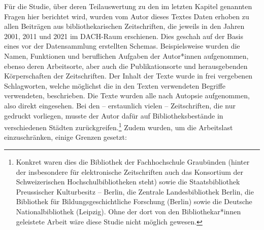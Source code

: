 \documentclass[a4paper,
fontsize=11pt,
oneside,
numbers=noperiodatend,
parskip=half-,
bibliography=totoc,
final
]{scrartcl}
\begin{document}
Für die Studie, über deren Teilauswertung zu den im letzten Kapitel
genannten Fragen hier berichtet wird, wurden vom Autor dieses Textes
Daten erhoben zu allen Beiträgen aus bibliothekarischen Zeitschriften,
die jeweils in den Jahren 2001, 2011 und 2021 im DACH-Raum erschienen.
Dies geschah auf der Basis eines vor der Datensammlung erstellten
Schemas. Beispielsweise wurden die Namen, Funktionen und beruflichen
Aufgaben der Autor*innen aufgenommen, ebenso deren Arbeitsorte, aber
auch die Publikationsorte und herausgebenden Körperschaften der
Zeitschriften. Der Inhalt der Texte wurde in frei vergebenen
Schlagworten, welche möglichst die in den Texten verwendeten Begriffe
verwendeten, beschrieben. Die Texte wurden alle nach Autopsie
aufgenommen, also direkt eingesehen. Bei den -- erstaunlich vielen --
Zeitschriften, die nur gedruckt vorliegen, musste der Autor dafür auf
Bibliotheksbestände in verschiedenen Städten zurückgreifen.\footnote{Konkret
  waren dies die Bibliothek der Fachhochschule Graubünden (hinter der
  insbesondere für elektronische Zeitschriften auch das Konsortium der
  Schweizerischen Hochschulbibliotheken steht) sowie die
  Staatsbibliothek Preussischer Kulturbesitz -- Berlin, die Zentrale
  Landesbibliothek Berlin, die Bibliothek für Bildungsgeschichtliche
  Forschung (Berlin) sowie die Deutsche Nationalbibliothek (Leipzig).
  Ohne der dort von den Bibliothekar*innen geleistete Arbeit wäre diese
  Studie nicht möglich gewesen.} Zudem wurden, um die Arbeitslast
einzuschränken, einige Grenzen gesetzt:
\end{document}
